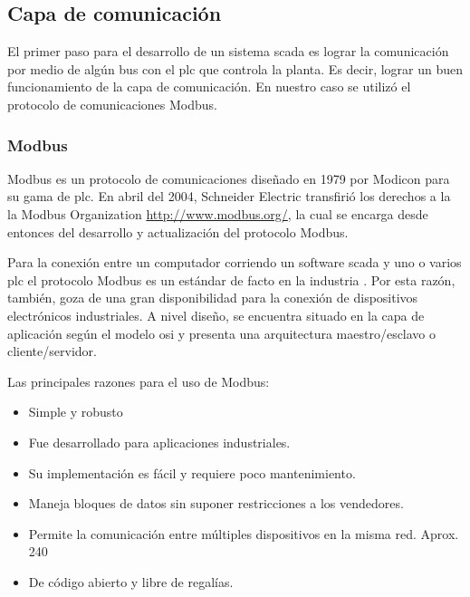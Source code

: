 \subsection{Capa de comunicación}
\label{subsec:CapaComunicacion}
El primer paso para el desarrollo de un sistema \gls{scada} es lograr la 
comunicación por medio de algún bus con el \gls{plc} que controla la planta. Es 
decir, lograr un buen funcionamiento de la capa de comunicación. En nuestro caso 
se utilizó el protocolo de comunicaciones Modbus. 

\subsubsection{Modbus}
Modbus es un protocolo de comunicaciones diseñado en 1979 por Modicon para su 
gama de \gls{plc}. En abril del 2004, Schneider Electric transfirió los 
derechos a la la Modbus Organization \url{http://www.modbus.org/}, la cual se 
encarga desde entonces del desarrollo y actualización del protocolo Modbus.

Para la conexión entre un computador corriendo un software \gls{scada} y uno o 
varios \gls{plc} el protocolo Modbus es un estándar de facto en la industria . 
Por esta razón, también, goza de una gran disponibilidad para la conexión de 
dispositivos electrónicos industriales. A nivel diseño, se encuentra situado en 
la capa de aplicación según el modelo \gls{osi} y presenta una arquitectura 
maestro/esclavo o cliente/servidor.

Las principales razones para el uso de Modbus:
\begin{itemize}
 \item Simple y robusto
 \item Fue desarrollado para aplicaciones industriales.
 \item Su implementación es fácil y requiere poco mantenimiento.
 \item Maneja bloques de datos sin suponer restricciones a los vendedores.
 \item Permite la comunicación entre múltiples dispositivos en la misma red. 
  Aprox. 240
 \item De código abierto y libre de regalías.%
\end{itemize}


